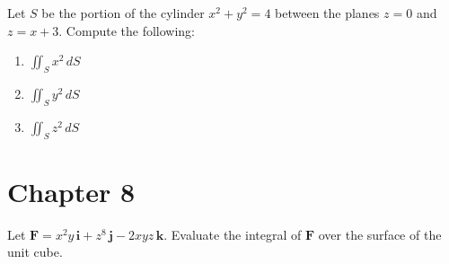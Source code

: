 \documentclass[openany]{book}
\begin{document}
\begin{prob}[27]
    Let \( S \) be the portion of the cylinder \( x^2 + y^2 = 4 \) between the planes \( z = 0 \) and \( z = x + 3 \). Compute the following:
    
    \begin{enumerate}
        \item[(a)] \( \iint_S x^2 \, dS \)
        \item[(b)] \( \iint_S y^2 \, dS \)
        \item[(c)] \( \iint_S z^2 \, dS \)
    \end{enumerate}
\end{prob}



\section{Chapter 8}

\begin{prob}[3]
    Let \( \mathbf{F} = x^2 y \, \mathbf{i} + z^8 \, \mathbf{j} - 2xyz \, \mathbf{k} \). Evaluate the integral of \( \mathbf{F} \) over the surface of the unit cube.
\end{prob}
\end{document}
